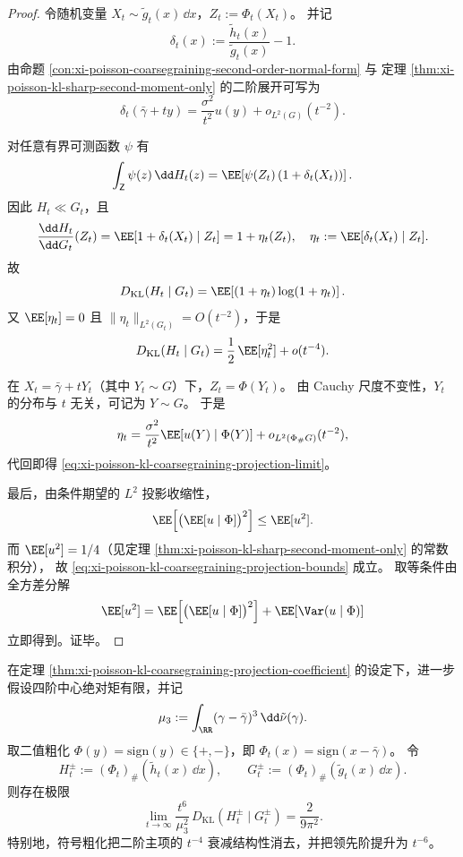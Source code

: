 \begin{proof}
令随机变量 \(X_t\sim \tilde g_t(x)\,\dd x\)，\(Z_t:=\Phi_t(X_t)\)。
并记
\[
\delta_t(x):=\frac{\tilde h_t(x)}{\tilde g_t(x)}-1.
\]
由命题 \ref{con:xi-poisson-coarsegraining-second-order-normal-form} 与
定理 \ref{thm:xi-poisson-kl-sharp-second-moment-only} 的二阶展开可写为
\[
\delta_t(\bar\gamma+ty)=\frac{\sigma^2}{t^2}u(y)+o_{L^2(G)}(t^{-2}).
\]

对任意有界可测函数 \(\psi\) 有
\[
\int_{\mathsf Z}\psi(z)\,\dd H_t(z)
=\EE\!\left[\psi(Z_t)\,(1+\delta_t(X_t))\right].
\]
因此 \(H_t\ll G_t\)，且
\[
\frac{\dd H_t}{\dd G_t}(Z_t)
=\EE[1+\delta_t(X_t)\mid Z_t]
=1+\eta_t(Z_t),
\quad
\eta_t:=\EE[\delta_t(X_t)\mid Z_t].
\]
故
\[
D_{\mathrm{KL}}(H_t\mid G_t)
=\EE\!\left[(1+\eta_t)\log(1+\eta_t)\right].
\]
又 \(\EE[\eta_t]=0\) 且 \(\|\eta_t\|_{L^2(G_t)}=O(t^{-2})\)，于是
\[
D_{\mathrm{KL}}(H_t\mid G_t)
=\frac12\,\EE[\eta_t^2]+o(t^{-4}).
\]

在 \(X_t=\bar\gamma+tY_t\)（其中 \(Y_t\sim G\)）下，\(Z_t=\Phi(Y_t)\)。
由 Cauchy 尺度不变性，\(Y_t\) 的分布与 \(t\) 无关，可记为 \(Y\sim G\)。
于是
\[
\eta_t
=\frac{\sigma^2}{t^2}\EE[u(Y)\mid \Phi(Y)]+o_{L^2(\Phi_{\#}G)}(t^{-2}),
\]
代回即得 \eqref{eq:xi-poisson-kl-coarsegraining-projection-limit}。

最后，由条件期望的 \(L^2\) 投影收缩性，
\[
\EE\!\left[\bigl(\EE[u\mid \Phi]\bigr)^2\right]\le \EE[u^2].
\]
而 \(\EE[u^2]=1/4\)（见定理 \ref{thm:xi-poisson-kl-sharp-second-moment-only} 的常数积分），
故 \eqref{eq:xi-poisson-kl-coarsegraining-projection-bounds} 成立。
取等条件由全方差分解
\[
\EE[u^2]
=\EE\!\left[\bigl(\EE[u\mid\Phi]\bigr)^2\right]
+\EE[\Var(u\mid\Phi)]
\]
立即得到。证毕。
\end{proof}

\begin{theorem}[符号粗化的幂律跃迁与显式常数]\label{thm:xi-poisson-sign-coarsegraining-t6-constant}
在定理 \ref{thm:xi-poisson-kl-coarsegraining-projection-coefficient} 的设定下，进一步假设四阶中心绝对矩有限，并记
\[
\mu_3:=\int_{\RR}(\gamma-\bar\gamma)^3\,\dd\tilde\nu(\gamma).
\]
取二值粗化 \(\Phi(y)=\mathrm{sign}(y)\in\{+,-\}\)，即
\(
\Phi_t(x)=\mathrm{sign}(x-\bar\gamma)
\)。
令
\[
H_t^{\pm}:=(\Phi_t)_{\#}(\tilde h_t(x)\,\dd x),\qquad
G_t^{\pm}:=(\Phi_t)_{\#}(\tilde g_t(x)\,\dd x).
\]
则存在极限
\begin{equation}\label{eq:xi-poisson-sign-coarsegraining-t6-constant}
\boxed{
\lim_{t\to\infty}\frac{t^6}{\mu_3^2}\,D_{\mathrm{KL}}(H_t^{\pm}\mid G_t^{\pm})
=\frac{2}{9\pi^2}
}.
\end{equation}
特别地，符号粗化把二阶主项的 \(t^{-4}\) 衰减结构性消去，并把领先阶提升为 \(t^{-6}\)。
\end{theorem}

